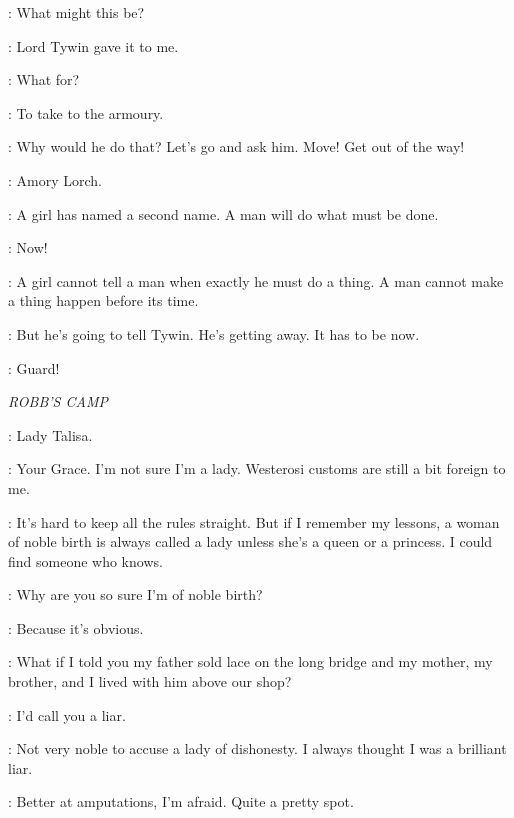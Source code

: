 \AMORY: What might this be? 

\ARYA: Lord Tywin gave it to me. 

\AMORY: What for? 

\ARYA: To take to the armoury. 

\AMORY: Why would he do that? Let's go and ask him.  Move! Get out of the way! 


\ARYA: Amory Lorch. 

\JAQEN: A girl has named a second name. A man will do what must be done. 

\ARYA: Now! 

\JAQEN: A girl cannot tell a man when exactly he must do a thing. A man cannot make a thing happen before its time. 

\ARYA: But he's going to tell Tywin. He's getting away. It has to be now. 


\TYWIN: Guard! 


\scene

\textit{ROBB'S CAMP} 


\ROBB: Lady Talisa. 

\TALISA: Your Grace. I'm not sure I'm a lady. Westerosi customs are still a bit foreign to me. 

\ROBB: It's hard to keep all the rules straight. But if I remember my lessons, a woman of noble birth is always called a lady unless she's a queen or a princess. I could find someone who knows. 

\TALISA: Why are you so sure I'm of noble birth? 

\ROBB: Because it's obvious. 

\TALISA: What if I told you my father sold lace on the long bridge and my mother, my brother, and I lived with him above our shop? 

\ROBB: I'd call you a liar. 

\TALISA: Not very noble to accuse a lady of dishonesty. I always thought I was a brilliant liar. 

\ROBB: Better at amputations, I'm afraid. Quite a pretty spot. 

